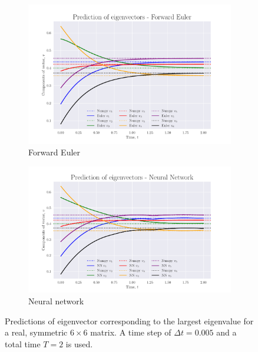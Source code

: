 \documentclass[12pt]{extarticle}
\begin{document}
\begin{figure}[h]
	\centering
	\begin{subfigure}{0.49\textwidth}
		\centering
		\includegraphics[width=\textwidth]{../output/plots/FE_eigvec_T2_N1000_dim6.pdf}
		\caption{Forward Euler}
		\label{fig:FE_eigvec_T2_N1000_dim6}
	\end{subfigure}
	\hfill
	\begin{subfigure}{0.49\textwidth}
		\centering
		\includegraphics[width=\textwidth]{../output/plots/NN_eigvec_T2_N1000_dim6.pdf}
		\caption{Neural network}
		\label{fig:NN_eigvec_T2_N1000_dim6}
	\end{subfigure}
	\caption{Predictions of eigenvector corresponding to the largest eigenvalue for a real, symmetric $6\times 6$ matrix. A time step of $\Delta t = 0.005$ and a total time $T=2$ is used.}
	\label{fig:eigvec_T2_N1000_dim6}
\end{figure}
\end{document}
